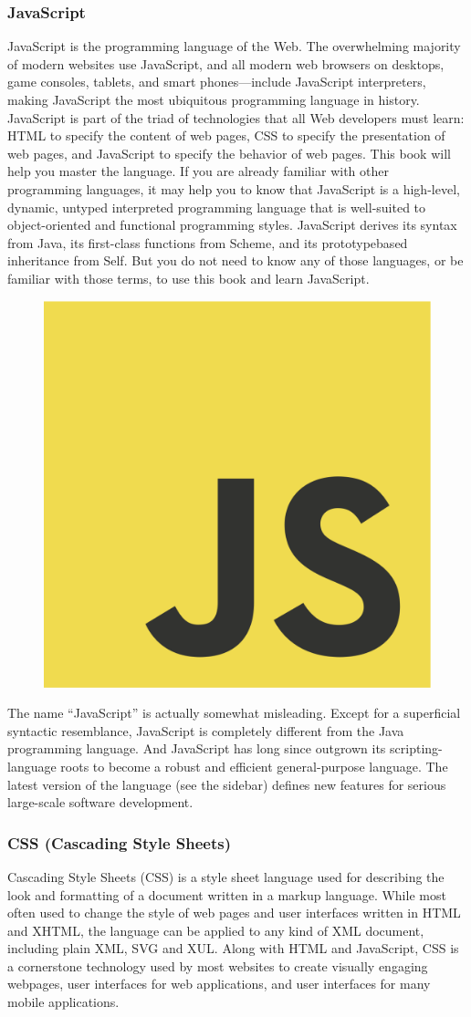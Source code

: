 \subsubsection*{JavaScript}
JavaScript is the programming language of the Web. The overwhelming majority of
modern websites use JavaScript, and all modern web browsers on desktops, game
consoles, tablets, and smart phones—include JavaScript interpreters, making JavaScript
the most ubiquitous programming language in history. JavaScript is part of the
triad of technologies that all Web developers must learn: HTML to specify the content
of web pages, CSS to specify the presentation of web pages, and JavaScript to specify
the behavior of web pages. This book will help you master the language.
If you are already familiar with other programming languages, it may help you to know
that JavaScript is a high-level, dynamic, untyped interpreted programming language
that is well-suited to object-oriented and functional programming styles. JavaScript
derives its syntax from Java, its first-class functions from Scheme, and its prototypebased
inheritance from Self. But you do not need to know any of those languages, or
be familiar with those terms, to use this book and learn JavaScript.
\newline
\begin{figure}[h]
	\centering
	\includegraphics[width=0.4\linewidth]{images/js}
	\label{fig:js-logo}
\end{figure}
The name “JavaScript” is actually somewhat misleading. Except for a superficial syntactic
resemblance, JavaScript is completely different from the Java programming language.
And JavaScript has long since outgrown its scripting-language roots to become
a robust and efficient general-purpose language. The latest version of the language (see
the sidebar) defines new features for serious large-scale software development.

\subsubsection*{CSS (Cascading Style Sheets)}
Cascading Style Sheets (CSS) is a style sheet language used for describing the look and formatting of a document written in a markup language. While most often used to change the style of web pages and user interfaces written in HTML and XHTML, the language can be applied to any kind of XML document, including plain XML, SVG and XUL. Along with HTML and JavaScript, CSS is a cornerstone technology used by most websites to create visually engaging webpages, user interfaces for web applications, and user interfaces for many mobile applications.
\newline

